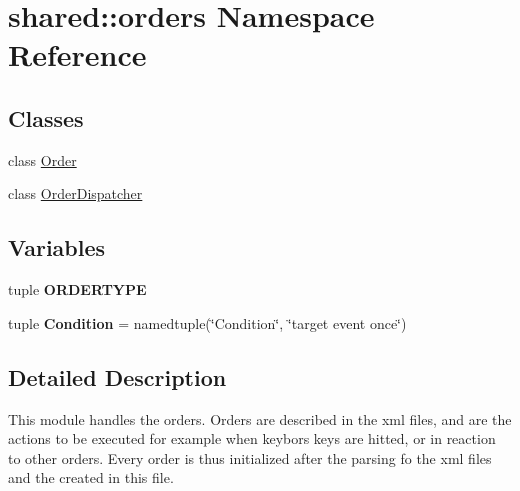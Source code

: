 \hypertarget{namespaceshared_1_1orders}{\section{shared\-:\-:orders \-Namespace \-Reference}
\label{namespaceshared_1_1orders}
}
\subsection*{\-Classes}
\begin{DoxyCompactItemize}
\item 
class \hyperlink{classshared_1_1orders_1_1_order}{\-Order}
\item 
class \hyperlink{classshared_1_1orders_1_1_order_dispatcher}{\-Order\-Dispatcher}
\end{DoxyCompactItemize}
\subsection*{\-Variables}
\begin{DoxyCompactItemize}
\item 
tuple {\bfseries \-O\-R\-D\-E\-R\-T\-Y\-P\-E}
\item 
\hypertarget{namespaceshared_1_1orders_a607645acfe014b5edd5ea3642b78353e}{tuple {\bfseries \-Condition} = namedtuple(\char`\"{}\-Condition\char`\"{}, \char`\"{}target event once\char`\"{})}\label{namespaceshared_1_1orders_a607645acfe014b5edd5ea3642b78353e}

\end{DoxyCompactItemize}


\subsection{\-Detailed \-Description}
\begin{DoxyVerb}
This module handles the orders.
Orders are described in the xml files, and are the actions to be executed
for example when keybors keys are hitted, or in reaction to other orders.
Every order is thus initialized after the parsing fo the xml files
and the created in this file.
\end{DoxyVerb}
 

